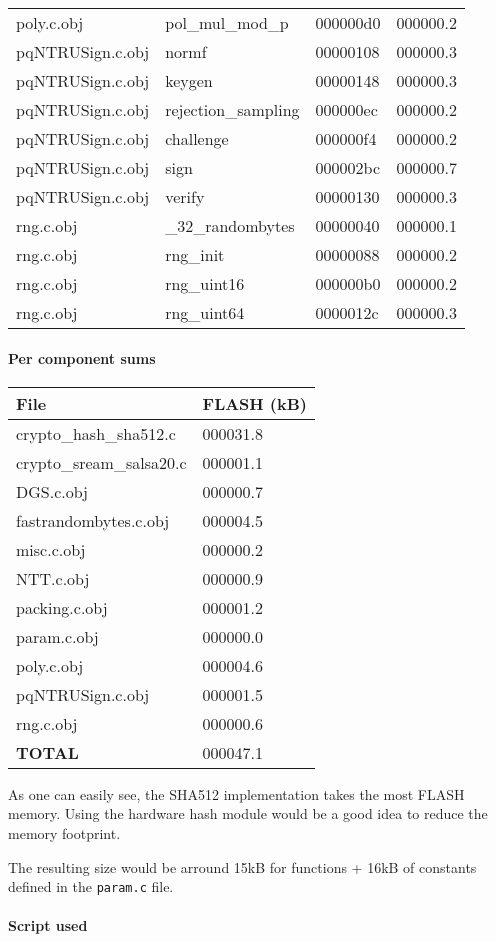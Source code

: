 \documentclass[
]{article}
\newenvironment{Shaded}{}{}
\newcommand{\BuiltInTok}[1]{#1}
\newcommand{\ExtensionTok}[1]{#1}
\newcommand{\FunctionTok}[1]{\textcolor[rgb]{0.02,0.16,0.49}{#1}}
\newcommand{\KeywordTok}[1]{\textcolor[rgb]{0.00,0.44,0.13}{\textbf{#1}}}
\newcommand{\NormalTok}[1]{#1}
\newcommand{\StringTok}[1]{\textcolor[rgb]{0.25,0.44,0.63}{#1}}
\newcommand{\VariableTok}[1]{\textcolor[rgb]{0.10,0.09,0.49}{#1}}
\begin{document}
\begin{longtable}[]{@{}llll@{}}
poly.c.obj & pol\_mul\_mod\_p & 000000d0 & 000000.2\tabularnewline
pqNTRUSign.c.obj & normf & 00000108 & 000000.3\tabularnewline
pqNTRUSign.c.obj & keygen & 00000148 & 000000.3\tabularnewline
pqNTRUSign.c.obj & rejection\_sampling & 000000ec &
000000.2\tabularnewline
pqNTRUSign.c.obj & challenge & 000000f4 & 000000.2\tabularnewline
pqNTRUSign.c.obj & sign & 000002bc & 000000.7\tabularnewline
pqNTRUSign.c.obj & verify & 00000130 & 000000.3\tabularnewline
rng.c.obj & \_32\_randombytes & 00000040 & 000000.1\tabularnewline
rng.c.obj & rng\_init & 00000088 & 000000.2\tabularnewline
rng.c.obj & rng\_uint16 & 000000b0 & 000000.2\tabularnewline
rng.c.obj & rng\_uint64 & 0000012c & 000000.3\tabularnewline
\bottomrule
\end{longtable}

\hypertarget{per-component-sums}{%
\paragraph{Per component sums}\label{per-component-sums}}

\begin{longtable}[]{@{}ll@{}}
\toprule
File & FLASH (kB)\tabularnewline
\midrule
\endhead
crypto\_hash\_sha512.c & 000031.8\tabularnewline
crypto\_sream\_salsa20.c & 000001.1\tabularnewline
DGS.c.obj & 000000.7\tabularnewline
fastrandombytes.c.obj & 000004.5\tabularnewline
misc.c.obj & 000000.2\tabularnewline
NTT.c.obj & 000000.9\tabularnewline
packing.c.obj & 000001.2\tabularnewline
param.c.obj & 000000.0\tabularnewline
poly.c.obj & 000004.6\tabularnewline
pqNTRUSign.c.obj & 000001.5\tabularnewline
rng.c.obj & 000000.6\tabularnewline
\textbf{TOTAL} & 000047.1\tabularnewline
\bottomrule
\end{longtable}

As one can easily see, the SHA512 implementation takes the most FLASH
memory. Using the hardware hash module would be a good idea to reduce
the memory footprint.

The resulting size would be arround 15kB for functions + 16kB of
constants defined in the \texttt{param.c} file.

\hypertarget{script-used}{%
\paragraph{Script used}\label{script-used}}

\begin{Shaded}
\end{Shaded}
\end{document}
